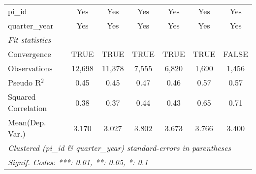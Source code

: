 \begin{tabular}{lcccccc}
   pi\_id                                                     & Yes            & Yes            & Yes           & Yes           & Yes           & Yes\\  
   quarter\_year                                              & Yes            & Yes            & Yes           & Yes           & Yes           & Yes\\  
   \midrule
   \emph{Fit statistics}\\
   Convergence                                                &TRUE            & TRUE           & TRUE          & TRUE          & TRUE          & FALSE\\  
   Observations                                               & 12,698         & 11,378         & 7,555         & 6,820         & 1,690         & 1,456\\  
   Pseudo R$^2$                                               & 0.45           & 0.45           & 0.47          & 0.46          & 0.57          & 0.57\\  
   Squared Correlation                                        & 0.38           & 0.37           & 0.44          & 0.43          & 0.65          & 0.71\\  
Mean(Dep. Var.) & 3.170 & 3.027 & 3.802 & 3.673 & 3.766 & 3.400 \\
   \midrule \midrule
   \multicolumn{7}{l}{\emph{Clustered (pi\_id \& quarter\_year) standard-errors in parentheses}}\\
   \multicolumn{7}{l}{\emph{Signif. Codes: ***: 0.01, **: 0.05, *: 0.1}}\\
\end{tabular}
\par\endgroup

